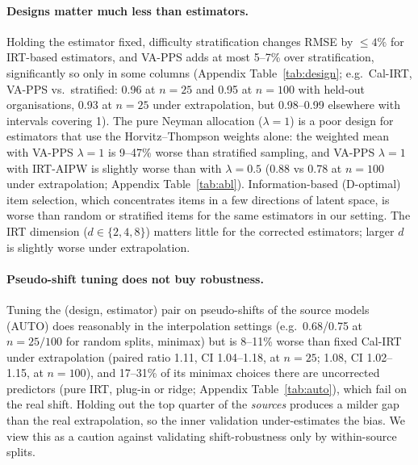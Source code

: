 \begin{table}[t]
\caption{Signed error and its share in the MSE at $n=100$: average over benchmarks of the mean signed error $\hat a_t-a_t$ over target models (accuracy points) and bias$^2$/MSE pooled over runs. A shared coreset produces some common-mode error even for unbiased methods.}
\label{tab:bias}
\centering\scriptsize\setlength{\tabcolsep}{3pt}

\end{table}

\paragraph{Designs matter much less than estimators.}
Holding the estimator fixed, difficulty stratification changes RMSE by $\le4\%$ for IRT-based estimators, and VA-PPS adds at most 5--7\% over stratification, significantly so only in some columns (Appendix Table~\ref{tab:design}; e.g.\ Cal-IRT, VA-PPS vs.\ stratified: 0.96 at $n=25$ and 0.95 at $n=100$ with held-out organisations, 0.93 at $n=25$ under extrapolation, but 0.98--0.99 elsewhere with intervals covering 1). The pure Neyman allocation ($\lambda=1$) is a poor design for estimators that use the Horvitz--Thompson weights alone: the weighted mean with VA-PPS $\lambda=1$ is 9--47\% worse than stratified sampling, and VA-PPS $\lambda=1$ with IRT-AIPW is slightly worse than with $\lambda=0.5$ (0.88 vs 0.78 at $n=100$ under extrapolation; Appendix Table~\ref{tab:abl}). Information-based (D-optimal) item selection, which concentrates items in a few directions of latent space, is worse than random or stratified items for the same estimators in our setting. The IRT dimension ($d\in\{2,4,8\}$) matters little for the corrected estimators; larger $d$ is slightly worse under extrapolation.

\paragraph{Pseudo-shift tuning does not buy robustness.}
Tuning the (design, estimator) pair on pseudo-shifts of the source models (AUTO) does reasonably in the interpolation settings (e.g.\ 0.68/0.75 at $n=25/100$ for random splits, minimax) but is 8--11\% worse than fixed Cal-IRT under extrapolation (paired ratio 1.11, CI 1.04--1.18, at $n=25$; 1.08, CI 1.02--1.15, at $n=100$), and 17--31\% of its minimax choices there are uncorrected predictors (pure IRT, plug-in or ridge; Appendix Table~\ref{tab:auto}), which fail on the real shift. Holding out the top quarter of the \emph{sources} produces a milder gap than the real extrapolation, so the inner validation under-estimates the bias. We view this as a caution against validating shift-robustness only by within-source splits.

